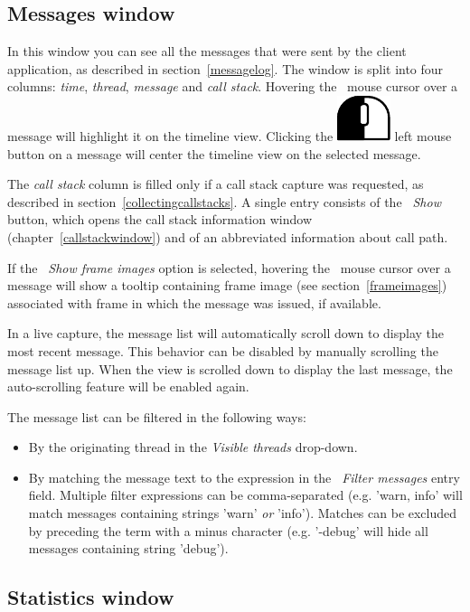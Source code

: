 \documentclass[hidelinks,titlepage,a4paper]{article}
\newcommand{\LMB}{\includegraphics[height=.8\baselineskip]{icons/lmb}}
\begin{document}
\subsection{Messages window}
\label{messages}

In this window you can see all the messages that were sent by the client application, as described in section~\ref{messagelog}. The window is split into four columns: \emph{time}, \emph{thread}, \emph{message} and \emph{call stack}. Hovering the \faMousePointer{}~mouse cursor over a message will highlight it on the timeline view. Clicking the \LMB{} left mouse button on a message will center the timeline view on the selected message.

The \emph{call stack} column is filled only if a call stack capture was requested, as described in section~\ref{collectingcallstacks}. A single entry consists of the \emph{\faAlignJustify{}~Show} button, which opens the call stack information window (chapter~\ref{callstackwindow}) and of an abbreviated information about call path.

If the \emph{\faImage{}~Show frame images} option is selected, hovering the \faMousePointer{}~mouse cursor over a message will show a tooltip containing frame image (see section~\ref{frameimages}) associated with frame in which the message was issued, if available.

In a live capture, the message list will automatically scroll down to display the most recent message. This behavior can be disabled by manually scrolling the message list up. When the view is scrolled down to display the last message, the auto-scrolling feature will be enabled again.

The message list can be filtered in the following ways:

\begin{itemize}
\item By the originating thread in the \emph{\faRandom{} Visible threads} drop-down.
\item By matching the message text to the expression in the \emph{\faFilter{}~Filter messages} entry field. Multiple filter expressions can be comma-separated (e.g. 'warn, info' will match messages containing strings 'warn' \emph{or} 'info'). Matches can be excluded by preceding the term with a minus character (e.g. '-debug' will hide all messages containing string 'debug').
\end{itemize}

\subsection{Statistics window}
\label{statistics}
\end{document}
